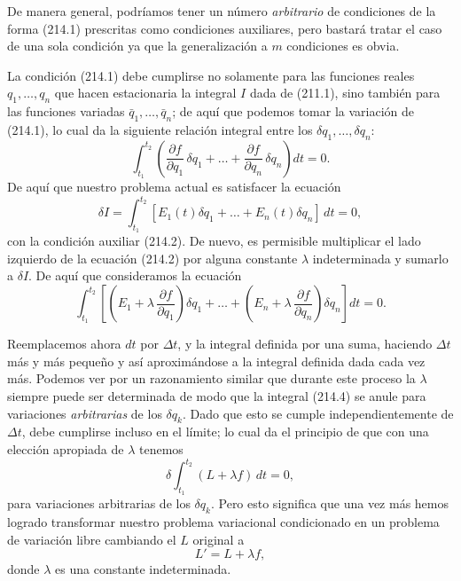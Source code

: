 \documentclass[12pt,a4paper]{book}
\begin{document}
De manera general, podríamos tener un número \textit{arbitrario} de condiciones de la forma (214.1) prescritas como condiciones auxiliares, pero bastará tratar el caso de una sola condición ya que la generalización a $m$ condiciones es obvia.

La condición (214.1) debe cumplirse no solamente para las funciones reales $q_1, \ldots, q_n$ que hacen estacionaria la integral $I$ dada de (211.1), sino también para las funciones variadas $\bar{q}_1, \ldots, \bar{q}_n$; de aquí que podemos tomar la variación de (214.1), lo cual da la siguiente relación integral entre los $\delta q_1, \ldots, \delta q_n$:
\begin{equation}
\int_{t_1}^{t_2} \left( \frac{\partial f}{\partial q_1} \, \delta q_1 + \ldots + \frac{\partial f}{\partial q_n} \, \delta q_n \right) dt = 0. \tag{214.2}
\end{equation}
De aquí que nuestro problema actual es satisfacer la ecuación
\begin{equation}
\delta I = \int_{t_1}^{t_2} [E_1(t)\delta q_1 + \ldots + E_n(t)\delta q_n] \, dt = 0, \tag{214.3}
\end{equation}
con la condición auxiliar (214.2). De nuevo, es permisible multiplicar el lado izquierdo de la ecuación (214.2) por alguna constante $\lambda$ indeterminada y sumarlo a $\delta I$. De aquí que consideramos la ecuación
\begin{equation}
\int_{t_1}^{t_2} \left[ \left( E_1 + \lambda \, \frac{\partial f}{\partial q_1} \right) \delta q_1 + \ldots + \left( E_n + \lambda \, \frac{\partial f}{\partial q_n} \right) \delta q_n \right] dt = 0. \tag{214.4}
\end{equation}

Reemplacemos ahora $dt$ por $\Delta t$, y la integral definida por una suma, haciendo $\Delta t$ más y más pequeño y así aproximándose a la integral definida dada cada vez más. Podemos ver por un razonamiento similar que durante este proceso la $\lambda$ siempre puede ser determinada de modo que la integral (214.4) se anule para variaciones \textit{arbitrarias} de los $\delta q_k$. Dado que esto se cumple independientemente de $\Delta t$, debe cumplirse incluso en el límite; lo cual da el principio de que con una elección apropiada de $\lambda$ tenemos
\begin{equation}
\delta \int_{t_1}^{t_2} (L + \lambda f) \, dt = 0, \tag{214.5}
\end{equation}
para variaciones arbitrarias de los $\delta q_k$. Pero esto significa que una vez más hemos logrado transformar nuestro problema variacional condicionado en un problema de variación libre cambiando el $L$ original a
\begin{equation}
L' = L + \lambda f, \tag{214.6}
\end{equation}
donde $\lambda$ es una constante indeterminada.
\end{document}
